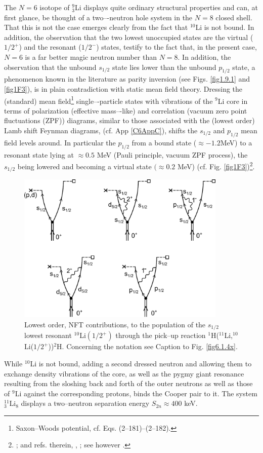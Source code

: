 The $N = 6$ isotope of $^9_3$Li displays quite ordinary structural properties and can, at first
glance, be thought of a two–-neutron hole system in the $N = 8$ closed shell. That this is not the case emerges clearly from the fact that $^{10}$Li is not bound. In addition, the observation that the two lowest unoccupied states are the  virtual ($1/2^+$) and the
resonant ($1/2^-$) states, testify to the fact that, in the present case,  $N = 6$ is a far better
magic neutron number  than $N = 8$. In addition, the observation  that the unbound $s_{1/2}$
state lies lower than the unbound $p_{1/2}$ state, a phenomenon known in the literature as parity inversion (see Figs. \ref{fig1.9.1} and \ref{fig1F3}), is in   plain contradiction with static mean field
theory. Dressing the (standard) mean field\footnote{ Saxon--Woods potential, cf. \cite{Bohr:69} Eqs. (2--181)--(2--182).} single–-particle states with vibrations of the $^9$Li core  in terms of
polarization (effective mass–-like) and correlation  (vacuum zero point fluctuations
(ZPF)) diagrams, similar to those associated with the (lowest order) Lamb shift Feynman
diagrams, (cf. App \ref{C6AppC}), shifts the $s_{1/2}$ and $p_{1/2}$ mean field levels around. In particular the $p_{1/2}$ from a
bound state ($\approx-1.2$MeV) to a resonant state lying at $\approx0.5$ MeV (Pauli principle, vacuum
ZPF process), the $s_{1/2}$ being lowered and becoming a virtual state $(\approx 0.2$ MeV) (cf. Fig. \ref{fig1F3})\footnote{\cite{Barranco:01}; and refs. therein, \cite{Tanihata:13}, \cite{Sanetullaev:16}; see however \cite{Cavallaro:17}.}.
 \begin{figure}
\centerline{\includegraphics*[width=10cm,angle=0]{C6/figs_C6/fig4_2_7}}
\caption{Lowest order, NFT contributions, to the population of the $s_{1/2}$ lowest resonant $^{10}$Li$(1/2^+)$ through the pick--up reaction $^1$H($^{11}$Li,$^{10}$Li($1/2^+$))$^2$H. Concerning the notation see Caption to Fig. \ref{fig6.1.4x}.}\label{fig4.2.7}
\end{figure}
While $^{10}$Li is not bound, adding a second dressed neutron and allowing them to exchange density vibrations of the  core, as well as the pygmy giant resonance resulting from the sloshing back and forth of the outer neutrons as well as those of $^9$Li against the corresponding protons, binds the Cooper pair to it. The system $^{11}_{3}$Li$_8$ displays a two--neutron separation energy $S_{2n}\approx 400$ keV.


